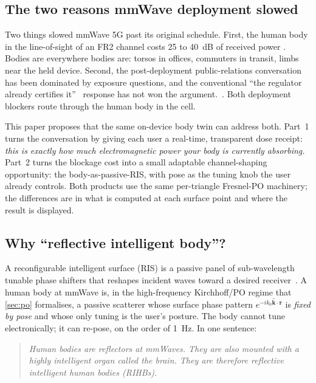 \documentclass[11pt,a4paper]{article}
\theoremstyle{definition}
\newcommand{\khat}{\hat{\bm{k}}}
\newcommand{\rr}{\mathbf{r}}
\begin{document}
\subsection{The two reasons mmWave deployment slowed}

Two things slowed mmWave 5G past its original schedule.  First, the
human body in the line-of-sight of an FR2 channel costs
\SI{25}{} to \SI{40}{dB} of received power
\cite{MacCartney2017,Maccartney2017blockage}.  Bodies are
everywhere bodies are: torsos in offices, commuters in transit,
limbs near the held device.  Second, the post-deployment
public-relations conversation has been dominated by exposure
questions, and the conventional ``the regulator already certifies
it''~\cite{ICNIRP2020} response has not won the
argument.~\cite{Roosli2010, Roosli2021}.  Both deployment blockers
route through the human body in the cell.

This paper proposes that the same on-device body twin can address
both.  Part~1 turns the conversation by giving each user a
real-time, transparent dose receipt: \emph{this is exactly how
much electromagnetic power your body is currently absorbing.}
Part~2 turns the blockage cost into a small adaptable
channel-shaping opportunity: the body-as-passive-RIS, with pose
as the tuning knob the user already controls.  Both products use
the same per-triangle Fresnel-PO machinery; the differences are in
what is computed at each surface point and where the result is
displayed.

\subsection{Why ``reflective intelligent body''?}

A reconfigurable intelligent surface (RIS) is a passive panel of
sub-wavelength tunable phase shifters that reshapes incident waves
toward a desired receiver~\cite{DiRenzo2020,Wu2019}.  A human body
at mmWave is, in the high-frequency Kirchhoff/PO regime that
\cref{sec:po} formalises, a passive scatterer whose surface phase
pattern $e^{-ik_0\khat\cdot\rr}$ is \emph{fixed by pose} and whose
only tuning is the user's posture.  The body cannot tune
electronically; it can re-pose, on the order of \SI{1}{\Hz}.  In
one sentence:

\begin{quote}
\emph{Human bodies are reflectors at mmWaves.  They are also
mounted with a highly intelligent organ called the brain.  They
are therefore reflective intelligent human bodies (RIHBs).}
\end{quote}
\end{document}
